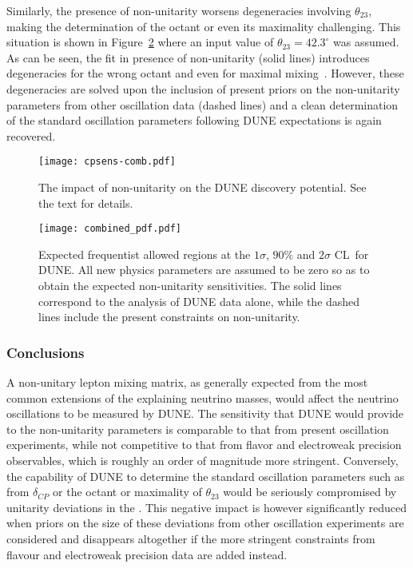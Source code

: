Similarly, the presence of non-unitarity worsens degeneracies involving $\theta_{23}$, making the determination of the octant or even its maximality challenging.
This situation is shown in Figure~\ref{fig:octant} where an input value of $\theta_{23} = 42.3^\circ$ was assumed. As can be seen, the fit in presence of non-unitarity (solid lines) introduces degeneracies for the wrong octant and even for maximal mixing~\cite{Blennow:2016jkn}. However, these degeneracies are solved upon the inclusion of present priors on the non-unitarity parameters from other oscillation data (dashed lines) and a clean determination of the standard oscillation parameters following DUNE expectations is again recovered.   

\begin{figure}[!t]
\centering
 \texttt{[image: cpsens-comb.pdf]}
\caption[Impact of non-unitarity on the  discovery potential]{The impact of non-unitarity on the DUNE  discovery potential. See the text for details.}
\label{fig:CPsens}
\end{figure}

\begin{figure}
 \texttt{[image: combined\_pdf.pdf]} 
 \begin{center}
  \caption[Expected frequentist allowed regions at the $1 \sigma$,
    $90\%$ and $2 \sigma$ CL\ ]{Expected frequentist allowed regions at the $1 \sigma$,
    $90\%$ and $2 \sigma$ CL\ for DUNE. All new physics parameters
    are assumed to be zero so as to obtain the expected
    non-unitarity sensitivities. The solid
    lines correspond to the analysis of DUNE data alone, while the
    dashed lines include the present constraints on non-unitarity.
\label{fig:octant}}
 \end{center}
\end{figure}

\subsubsection{Conclusions}
A non-unitary lepton mixing matrix, as generally expected from the most common extensions of the   explaining neutrino masses, would affect the neutrino oscillations to be measured by DUNE. The sensitivity that DUNE would provide to the non-unitarity parameters is comparable to that from present oscillation experiments, while not competitive to that from flavor and electroweak precision observables, which is roughly an order of magnitude more stringent. Conversely, the capability of DUNE to determine the standard oscillation parameters such as  from $\delta_{CP}$ or the octant or maximality of $\theta_{23}$ would be seriously compromised by unitarity deviations in the . This negative impact is however significantly reduced when priors on the size of these deviations from other oscillation experiments are considered and disappears altogether if the more stringent constraints from flavour and electroweak precision data are added instead.

